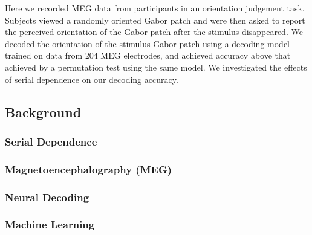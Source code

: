 \documentclass[../main.tex]{subfiles}
\begin{document}
Here we recorded MEG data from participants in an orientation judgement task. Subjects viewed a randomly oriented Gabor patch and were then asked to report the perceived orientation of the Gabor patch after the stimulus disappeared. We decoded the orientation of the stimulus Gabor patch using a decoding model trained on data from 204 MEG electrodes, and achieved accuracy above that achieved by a permutation test using the same model. We investigated the effects of serial dependence on our decoding accuracy.



\subsection{Background}
\subsubsection{Serial Dependence}

\subsubsection{Magnetoencephalography (MEG)}

\subsubsection{Neural Decoding}

\subsubsection{Machine Learning}
\end{document}
